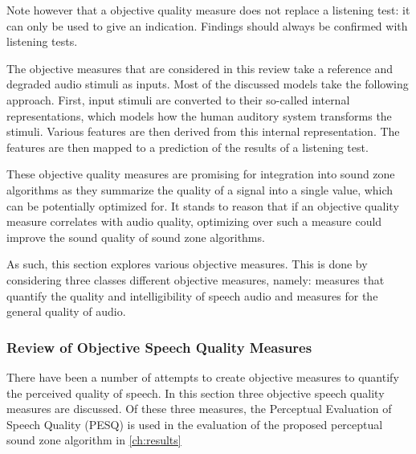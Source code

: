 Note however that a objective quality measure does not replace a listening test: it can only be used to give an 
indication.
Findings should always be confirmed with listening tests.

The objective measures that are considered in this review take a reference and degraded audio stimuli as inputs.
Most of the discussed models take the following approach.
First, input stimuli are converted to their so-called internal representations, which models how the 
human auditory system transforms the stimuli.
Various features are then derived from this internal representation.
The features are then mapped to a prediction of the results of a listening test.

These objective quality measures are promising for integration into sound zone algorithms as they summarize the 
quality of a signal into a single value, which can be potentially optimized for. 
It stands to reason that if an objective quality measure correlates with audio quality, optimizing over such a measure
could improve the sound quality of sound zone algorithms.

As such, this section explores various objective measures.
This is done by considering three classes different objective measures, namely: measures that quantify the quality 
and intelligibility of speech audio and measures for the general quality of audio. 

\subsubsection{Review of Objective Speech Quality Measures}
There have been a number of attempts to create objective measures to quantify the perceived quality of speech.
In this section three objective speech quality measures are discussed.
Of these three measures, the Perceptual Evaluation of Speech Quality (PESQ) is used in the evaluation of 
the proposed perceptual sound zone algorithm in \autoref{ch:results}


